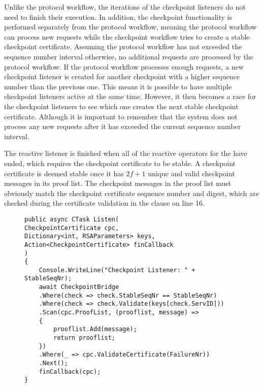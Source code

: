 Unlike the protocol workflow, the iterations of the checkpoint listeners do not need to finish their execution. In addition, the checkpoint functionality is performed separately from the protocol workflow, meaning the protocol workflow can process new requests while the checkpoint workflow tries to create a stable checkpoint certificate. Assuming the protocol workflow has not exceeded the sequence number interval otherwise, no additional requests are processed by the protocol workflow.
If the protocol workflow processes enough requests, a new checkpoint listener is created for another checkpoint with a higher sequence number than the previous one. This means it is possible to have multiple checkpoint listeners active at the same time. However, it then becomes a race for the checkpoint listeners to see which one creates the next stable checkpoint certificate. Although it is important to remember that the system does not process any new requests after it has exceeded the current sequence number interval. 

The reactive listener is finished when all of the reactive operators for the  have ended, which requires the checkpoint certificate to be stable. A checkpoint certificate is deemed stable once it has $2f+1$ unique and valid checkpoint messages in its proof list. The checkpoint messages in the proof list must obviously match the checkpoint certificate sequence number and digest, which are checked during the certificate validation in the  clause on line 16.

\begin{figure}[H]
	\centering
	\begin{lstlisting}[label = code:CreateCheckpoint, caption=Source code for the Checkpoint Listener, captionpos = b, basicstyle=\scriptsize]
public async CTask Listen(
CheckpointCertificate cpc, 
Dictionary<int, RSAParameters> keys, 
Action<CheckpointCertificate> finCallback
)
{
    Console.WriteLine("Checkpoint Listener: " + StableSeqNr);
    await CheckpointBridge
    .Where(check => check.StableSeqNr == StableSeqNr)
    .Where(check => check.Validate(keys[check.ServID]))
    .Scan(cpc.ProofList, (prooflist, message) =>
    {
        prooflist.Add(message);
        return prooflist;
    })
    .Where(_ => cpc.ValidateCertificate(FailureNr))
    .Next();
    finCallback(cpc);
}
    \end{lstlisting}
\end{figure}

